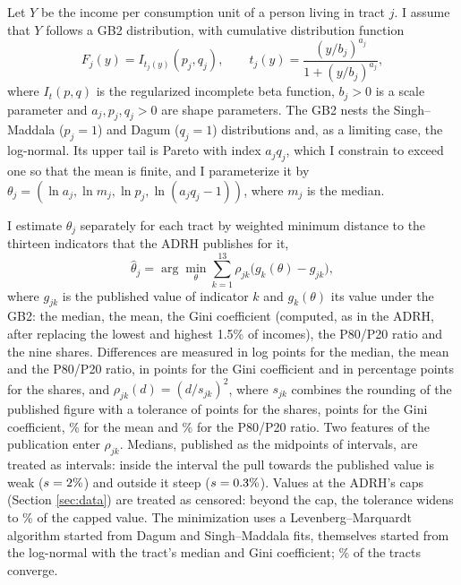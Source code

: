 Let $Y$ be the income per consumption unit of a person living in tract $j$. I assume that $Y$ follows a GB2 distribution, with cumulative distribution function
\begin{equation}\label{eq:gb2}
F_j(y) = I_{t_j(y)}(p_j, q_j), \qquad t_j(y) = \frac{(y/b_j)^{a_j}}{1 + (y/b_j)^{a_j}},
\end{equation}
where $I_t(p, q)$ is the regularized incomplete beta function, $b_j > 0$ is a scale parameter and $a_j, p_j, q_j > 0$ are shape parameters. The GB2 nests the Singh--Maddala ($p_j = 1$) and Dagum ($q_j = 1$) distributions and, as a limiting case, the log-normal. Its upper tail is Pareto with index $a_j q_j$, which I constrain to exceed one so that the mean is finite, and I parameterize it by $\theta_j = (\ln a_j, \ln m_j, \ln p_j, \ln(a_j q_j - 1))$, where $m_j$ is the median.

I estimate $\theta_j$ separately for each tract by weighted minimum distance to the thirteen indicators that the ADRH publishes for it,
\begin{equation}\label{eq:md}
\hat\theta_j = \arg\min_{\theta} \sum_{k=1}^{13} \rho_{jk}\big(g_k(\theta) - g_{jk}\big),
\end{equation}
where $g_{jk}$ is the published value of indicator $k$ and $g_k(\theta)$ its value under the GB2: the median, the mean, the Gini coefficient (computed, as in the ADRH, after replacing the lowest and highest 1.5\% of incomes), the P80/P20 ratio and the nine shares. Differences are measured in log points for the median, the mean and the P80/P20 ratio, in points for the Gini coefficient and in percentage points for the shares, and $\rho_{jk}(d) = (d/s_{jk})^2$, where $s_{jk}$ combines the rounding of the published figure with a tolerance of \TolShare{} points for the shares, \TolGini{} points for the Gini coefficient, \TolMeanPct{}\% for the mean and \TolPPct{}\% for the P80/P20 ratio. Two features of the publication enter $\rho_{jk}$. Medians, published as the midpoints of  intervals, are treated as intervals: inside the interval the pull towards the published value is weak ($s = 2{}\%$) and outside it steep ($s = 0.3{}\%$). Values at the ADRH's caps (Section \ref{sec:data}) are treated as censored: beyond the cap, the tolerance widens to \CapAllowPct{}\% of the capped value. The minimization uses a Levenberg--Marquardt algorithm started from Dagum and Singh--Maddala fits, themselves started from the log-normal with the tract's median and Gini coefficient; \GbConvergedPct{}\% of the \GbTracts{} tracts converge.

